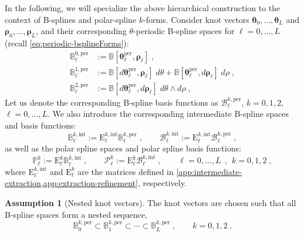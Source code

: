 \documentclass[10pt]{article}
\newcommand{\mbf}[1]{{\boldsymbol{#1}}}
\newcommand{\basis}[1]{\mathcal{#1}}
\newcommand{\vSpace}[1]{\mathbb{#1}}
\newcommand{\mat}[1]{\mbf{\mathrm{#1}}}
\newcommand{\cU}{\theta}
\newcommand{\cV}{\rho}
\newcommand{\dcU}{\mathit{d\cU}}
\newcommand{\dcV}{\mathit{d\cV}}
\newcommand{\kntU}{\cU}
\newcommand{\kntV}{\cV}
\newcommand{\kntsU}{\mbf{\kntU}}
\newcommand{\kntsV}{\mbf{\kntV}}
\newcommand{\pkntsU}{\kntsU^\per}
\newcommand{\bsp}{B}
\newcommand{\bspB}{\basis{\bsp}}
\newcommand{\bspS}{\vSpace{\bsp}}
\newcommand{\tpF}[2]{\bspS^{#1}}
\newcommand{\per}{\mathrm{per}}
\newcommand{\polar}{P}
\newcommand{\polarB}{\basis{\polar}}
\newcommand{\polarS}{\vSpace{\polar}}
\newcommand{\tint}{\mathrm{int}}
\theoremstyle{plain}
\theoremstyle{definition}
\newtheorem{assumption}{Assumption}
\theoremstyle{remark}
\begin{document}
In the following, we will specialize the above hierarchical construction to the context of B-splines and polar-spline $k$-forms.
Consider knot vectors $\kntsU_0, \dots, \kntsU_L$ and $\kntsV_0, \dots, \kntsV_L$, and their corresponding $\cU$-periodic B-spline spaces for $\ell = 0, \dots, L$ (recall \eqref{eq:periodic-bsplineForms}):
\begin{equation}
  \begin{split}
    \tpF{0,\per}{\pkntsU_\ell,\kntsV_\ell}_\ell &:= \bspS[\pkntsU_\ell,\kntsV_\ell]\;,\\
    \tpF{1,\per}{\pkntsU_\ell,\kntsV_\ell}_\ell &:= \bspS[d\pkntsU_\ell,\kntsV_\ell]\;\dcU + \bspS[\pkntsU_\ell,d\kntsV_\ell]\;\dcV\;,\\
    \tpF{2,\per}{\pkntsU_\ell,\kntsV_\ell}_\ell &:= \bspS[d\pkntsU_\ell,d\kntsV_\ell]\;\dcU\wedge \dcV\;,
  \end{split}
\end{equation}
Let us denote the corresponding B-spline basis functions as $\bspB^{k,\per}_\ell$, $k = 0, 1, 2$, $\ell = 0, \dots, L$.
We also introduce the corresponding intermediate B-spline spaces and basis functions:
\begin{equation}
    \bspS^{k,\tint}_\ell := \mat{E}^{k,\tint}_\ell\bspS^{k,\per}_\ell\;,\qquad
    \bspB^{k,\tint}_\ell := \mat{E}^{k,\tint}_\ell\bspB^{k,\per}_\ell\;,
\end{equation}
as well as the polar spline spaces and polar spline basis functions:
\begin{equation}\label{eq:polar-spline-levels}
    \polarS^k_\ell := \mat{E}^k_\ell\bspS^{k,\tint}_\ell\;,\qquad
    \polarB^k_\ell := \mat{E}^k_\ell\bspB^{k,\tint}_\ell\;,\qquad
    \ell = 0, \dots, L~~,~~k = 0, 1, 2\;,
\end{equation}
where $\mat{E}^{k,\tint}_\ell$ and $\mat{E}^k_\ell$ are the matrices defined in \cref{app:intermediate-extraction,app:extraction-refinement}, respectively.

\begin{assumption}[Nested knot vectors]\label{ass:knot-vectors-nested}
    The knot vectors are chosen such that all B-spline spaces form a nested sequence,
    \begin{equation}
        \bspS^{k,\per}_0 \subset \bspS^{k,\per}_1 \subset \cdots \subset \bspS^{k,\per}_L\;,\qquad k = 0, 1, 2\;.
    \end{equation}
\end{assumption}
\end{document}

